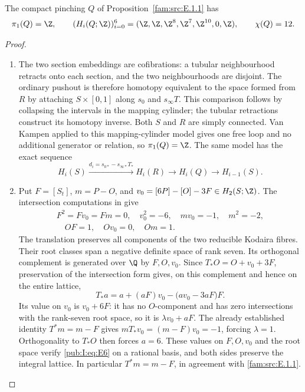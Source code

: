 \begin{proposition}\hypertarget{tag-01R4}{}\label{fam:src:E.1.4}\label{fam:st:E.1.4}

The compact pinching $Q$ of Proposition~\ref{fam:src:E.1.1} has
\[
 \pi_1(Q)=\Z,\qquad
 (H_i(Q;\Z))_{i=0}^6
   =(\Z,\Z,\Z^8,\Z^7,\Z^{10},0,\Z),\qquad\chi(Q)=12.
\]

\end{proposition}



\begin{proof}
\begin{enumerate}[label=\arabic*.,leftmargin=*]
\item The two section embeddings are cofibrations: a tubular neighbourhood
retracts onto each section, and the two neighbourhoods are disjoint.
The ordinary pushout is therefore homotopy equivalent to the space
formed from $R$ by attaching $S\times[0,1]$ along
$s_0$ and $s_\infty T$. This comparison follows by collapsing the
intervals in the mapping cylinder; the tubular retractions construct
its homotopy inverse. Both $S$ and $R$ are simply connected. Van
Kampen applied to this mapping-cylinder model gives one free loop
and no additional generator or relation, so $\pi_1(Q)=\Z$.
The same model has the exact sequence
\begin{equation}
 H_i(S)\xrightarrow{d_i=s_{0*}-s_{\infty*}T_*}H_i(R)
 \longrightarrow H_i(Q)\longrightarrow H_{i-1}(S).
\label{pub:I:eq:E4}
\end{equation}

\item Put $F=[S_t]$, $m=P-O$, and
$v_0=[6P]-[O]-3F\in H_2(S;\Z)$. The intersection computations in
\cite[Lemma~2.1, pp.~3--4]{Engel2026} give
\label{layout:I:2}
\begin{equation}
\begin{gathered}
F^2=Fv_0=Fm=0,\quad v_0^2=-6,\quad mv_0=-1,\quad m^2=-2,
 \\
\quad OF=1,\quad Ov_0=0,\quad Om=1.
\end{gathered}
\label{pub:I:eq:E5}
\end{equation}
The translation preserves all components of the two reducible
Kodaira fibres. Their root classes span a negative definite space of
rank seven. Its orthogonal complement is generated over $\Q$ by
$F,O,v_0$. Since $T_*O=O+v_0+3F$, preservation of the intersection
form gives, on this complement and hence on the entire lattice,
\begin{equation}
 T_*a=a+(aF)v_0-\bigl(av_0-3aF\bigr)F.
\label{pub:I:eq:E6}
\end{equation}
Its value on $v_0$ is $v_0+6F$: it has no $O$-component
and has zero intersections with the rank-seven root space, so it is
$\lambda v_0+aF$. The already established identity $T^*m=m-F$ gives
$mT_*v_0=(m-F)v_0=-1$, forcing $\lambda=1$. Orthogonality to
$T_*O$ then forces $a=6$. These
values on $F,O,v_0$ and the root space verify \eqref{pub:I:eq:E6} on a rational basis,
and both sides preserve the integral lattice. In particular
$T^*m=m-F$, in agreement with \ref{fam:src:E.1.1}.


\end{enumerate}
\end{proof}
